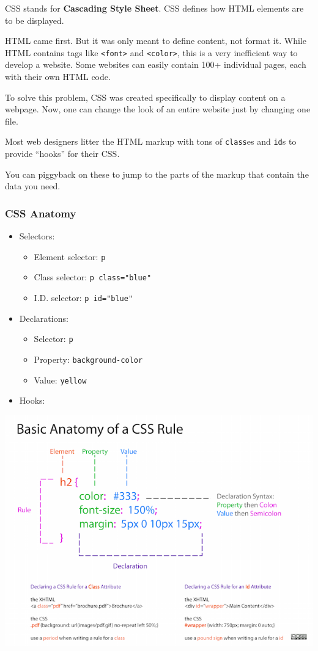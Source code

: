 \documentclass[
]{book}
\providecommand{\tightlist}{%
  \setlength{\itemsep}{0pt}\setlength{\parskip}{0pt}}
\begin{document}
CSS stands for \textbf{Cascading Style Sheet}. CSS defines how HTML elements are to be displayed.

HTML came first. But it was only meant to define content, not format it. While HTML contains tags like \texttt{\textless{}font\textgreater{}} and \texttt{\textless{}color\textgreater{}}, this is a very inefficient way to develop a website. Some websites can easily contain 100+ individual pages, each with their own HTML code.

To solve this problem, CSS was created specifically to display content on a webpage. Now, one can change the look of an entire website just by changing one file.

Most web designers litter the HTML markup with tons of \texttt{class}es and \texttt{id}s to provide ``hooks'' for their CSS.

You can piggyback on these to jump to the parts of the markup that contain the data you need.

\hypertarget{css-anatomy}{%
\subsubsection{CSS Anatomy}\label{css-anatomy}}

\begin{itemize}
\tightlist
\item
  Selectors:

  \begin{itemize}
  \tightlist
  \item
    Element selector: \texttt{p}
  \item
    Class selector: \texttt{p\ class="blue"}
  \item
    I.D. selector: \texttt{p\ id="blue"}
  \end{itemize}
\item
  Declarations:

  \begin{itemize}
  \tightlist
  \item
    Selector: \texttt{p}
  \item
    Property: \texttt{background-color}
  \item
    Value: \texttt{yellow}
  \end{itemize}
\item
  Hooks:
\end{itemize}

\begin{center}\includegraphics[width=0.7\linewidth]{img/css-rule-2} \end{center}
\end{document}
